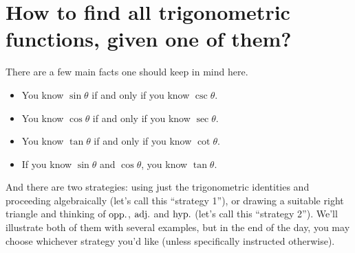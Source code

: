 \documentclass{ximera}
\begin{document}
\section{How to find all trigonometric functions, given one of them?}

There are a few main facts one should keep in mind here.
\begin{itemize}
\item You know $\sin\theta$ if and only if you know $\csc\theta$.
\item You know $\cos\theta$ if and only if you know $\sec\theta$.
\item You know $\tan\theta$ if and only if you know $\cot\theta$.
\item If you know $\sin\theta$ and $\cos\theta$, you know $\tan\theta$.
\end{itemize}

And there are two strategies: using just the trigonometric identities and proceeding algebraically (let's call this ``strategy 1''), or drawing a suitable right triangle and thinking of ${\rm opp.}$, ${\rm adj.}$ and ${\rm hyp.}$ (let's call this ``strategy 2''). We'll illustrate both of them with several examples, but in the end of the day, you may choose whichever strategy you'd like (unless specifically instructed otherwise).
\end{document}
